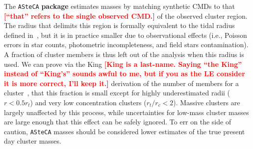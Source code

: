 \documentclass[draft]{aa}
\newcommand{\LEt}[1]{\textcolor{red}{\textbf{[#1]}}}
\begin{document}
The \texttt{ASteCA} \textbf{package} estimates masses by matching synthetic CMDs
to that \LEt{``that'' refers to the single observed CMD.} of the observed
cluster region.
The radius that delimits this region is formally equivalent to the
tidal radius defined in~\cite[][see Sect.~\ref{ssec:centre-radius}]{King_1962},
but it is in practice smaller due to observational effects (i.e., Poisson
errors in star counts, photometric incompleteness, and field stars contamination).
%
A fraction of cluster members is thus left out of the analysis when this radius
is used. We can prove via the King \LEt{King is a last-name. Saying ``the
King'' instead of ``King's'' sounds awful to me, but if you as the LE consider
it is more correct, I'll keep it.} derivation of the number of
members for a cluster~\citep[Eq. 18,][]{King_1962}, that this fraction is small
except for highly underestimated radii ($r{<}0.5r_t$) and very low concentration
clusters ($r_t/r_c{<}2$).
%
Massive clusters are largely unaffected by this process, while uncertainties for
low-mass cluster masses are large enough that this effect can be safely
ignored. To err on the side of caution, \texttt{ASteCA} masses should be
considered lower estimates of the true present day cluster masses.
\end{document}
